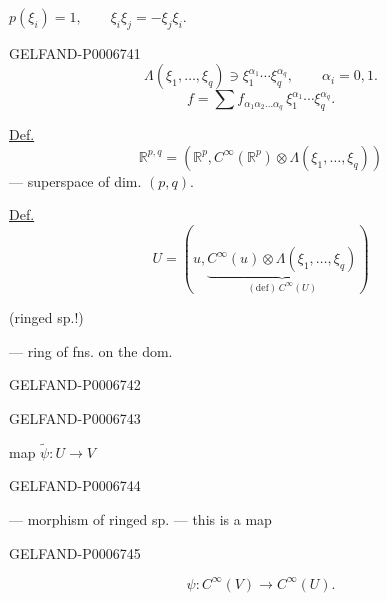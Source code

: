 \(p(\xi_i)=1,\qquad \xi_i\xi_j=-\xi_j\xi_i.\)


\begin{GelfandAdjacentEvidence}{GELFAND-P000674}{1}
\[
\Lambda(\xi_1,\ldots,\xi_q)\ni\xi_1^{\alpha_1}\cdots\xi_q^{\alpha_q},
\qquad \alpha_i=0,1.
\]
\[
f=\sum f_{\alpha_1\alpha_2\ldots\alpha_q}\,
     \xi_1^{\alpha_1}\cdots\xi_q^{\alpha_q}.
\]

\underline{Def.}
\[
\mathbb R^{p,q}=
\left(\mathbb R^p,C^\infty(\mathbb R^p)\otimes\Lambda(\xi_1,\ldots,\xi_q)\right)
\]
--- superspace of dim. \((p,q)\).

\underline{Def.}
\[
U=\left(u,\underbrace{C^\infty(u)\otimes\Lambda(\xi_1,\ldots,\xi_q)}
                        _{(\mathrm{def})\, C^\infty(U)}\right)
\]

(ringed sp.!)

--- ring of fns. on the dom.
\end{GelfandAdjacentEvidence}
\begin{GelfandAdjacentEvidence}{GELFAND-P000674}{2}

\end{GelfandAdjacentEvidence}
\begin{GelfandAdjacentEvidence}{GELFAND-P000674}{3}


map \(\widetilde{\psi}:U\to V\)
\end{GelfandAdjacentEvidence}
\begin{GelfandAdjacentEvidence}{GELFAND-P000674}{4}

--- morphism of ringed sp. ---
this is a map
\end{GelfandAdjacentEvidence}
\begin{GelfandAdjacentEvidence}{GELFAND-P000674}{5}

\[
\psi:C^\infty(V)\to C^\infty(U).
\]
\end{GelfandAdjacentEvidence}
